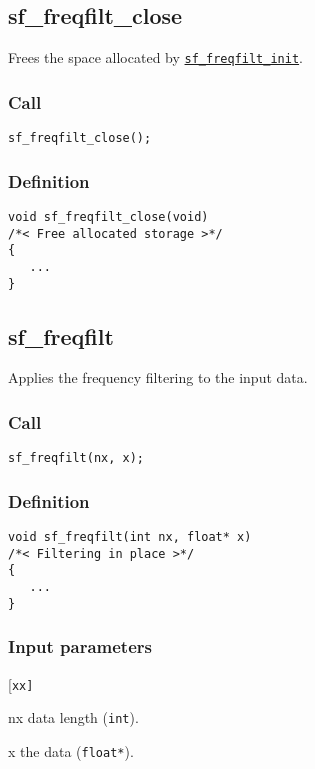 \subsection{{sf\_freqfilt\_close}}
Frees the space allocated by \hyperref[sec:sf_freqfilt2_init]{\texttt{sf\_freqfilt\_init}}.

\subsubsection*{Call}
\begin{verbatim}sf_freqfilt_close();\end{verbatim}

\subsubsection*{Definition}
\begin{verbatim}
void sf_freqfilt_close(void) 
/*< Free allocated storage >*/
{
   ...
}
\end{verbatim}




\subsection{{sf\_freqfilt}}
Applies the frequency filtering to the input data.

\subsubsection*{Call}
\begin{verbatim}sf_freqfilt(nx, x);\end{verbatim}

\subsubsection*{Definition}
\begin{verbatim}
void sf_freqfilt(int nx, float* x)
/*< Filtering in place >*/
{
   ...
}
\end{verbatim}

\subsubsection*{Input parameters}
\begin{desclist}{\tt }{\quad}[\tt xx]
   \setlength\itemsep{0pt}
   \item[nx] data length (\texttt{int}).  
   \item[x]  the data (\texttt{float*}).  
\end{desclist}




